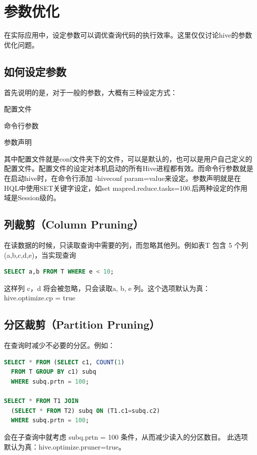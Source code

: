 \section{参数优化}
在实际应用中，设定参数可以调优查询代码的执行效率。这里仅仅讨论hive的参数优化问题。

\subsection{如何设定参数}
首先说明的是，对于一般的参数，大概有三种设定方式：
\begin{compactitem}
\item 配置文件
\item 命令行参数
\item 参数声明
\end{compactitem}
其中配置文件就是conf文件夹下的文件，可以是默认的，也可以是用户自己定义的配置文件。配置文件的设定对本机启动的所有Hive进程都有效。而命令行参数就是在启动hive时，在命令行添加 -hiveconf param=value来设定。参数声明就是在HQL中使用SET关键字设定，如set mapred.reduce.tasks=100.后两种设定的作用域是Session级的。

\subsection{列裁剪（Column Pruning）}
在读数据的时候，只读取查询中需要的列，而忽略其他列。例如表T 包含 5 个列 (a,b,c,d,e)，当实现查询

\begin{lstlisting}[language=SQL]
SELECT a,b FROM T WHERE e < 10;
\end{lstlisting}

这样列 c，d 将会被忽略，只会读取a, b, e 列。这个选项默认为真：hive.optimize.cp = true

\subsection{分区裁剪（Partition Pruning）}
在查询时减少不必要的分区。例如：

\begin{lstlisting}[language=SQL]
SELECT * FROM (SELECT c1, COUNT(1)
  FROM T GROUP BY c1) subq
  WHERE subq.prtn = 100;

SELECT * FROM T1 JOIN
  (SELECT * FROM T2) subq ON (T1.c1=subq.c2)
  WHERE subq.prtn = 100;
\end{lstlisting}

会在子查询中就考虑 subq.prtn = 100 条件，从而减少读入的分区数目。
此选项默认为真：hive.optimize.pruner=true。

